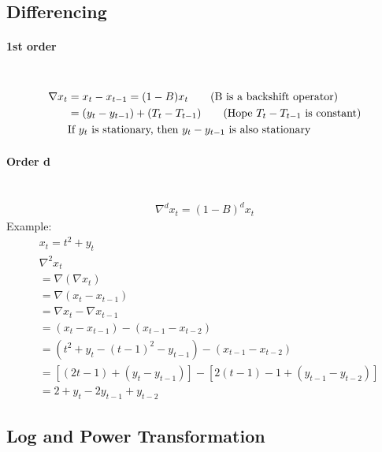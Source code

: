\subsection{Differencing} 
\paragraph{1st order} \mbox{}\\
    \begin{align*}
        \nabla x_t 
        & = x_t - x_{t-1} = (1-B)x_t \tag{B is a backshift operator} \\
        & = (y_t - y_{t-1}) + (T_t - T_{t-1}) \tag{Hope $T_t - T_{t-1}$ is constant} \\
        & \textrm{If $y_t$ is stationary, then $y_t - y_{t-1}$ is also stationary}
    \end{align*}
\paragraph{Order d} \mbox{}\\
    \begin{align*}
        \nabla^d x_t = (1-B)^d x_t 
    \end{align*}
Example:    
    \begin{align*}
        & x_t = t^2 + y_t \\
        & \nabla^2 x_t \\
        & = \nabla (\nabla x_t) \\
        & = \nabla (x_t - x_{t-1})\\
        & = \nabla x_t - \nabla x_{t-1}\\
        &= (x_t - x_{t-1}) - (x_{t-1} - x_{t-2}) \\
        &= (t^2 + y_t - (t-1)^2 - y_{t-1}) - (x_{t-1} - x_{t-2}) \\
        &= [(2t-1) + (y_t - y_{t-1})] - [2(t-1) - 1 + (y_{t-1} - y_{t-2})]\\
        &= 2 + y_t - 2y_{t-1} + y_{t-2} \tag{Constant + filtering of $y_t$ (approximation of second derivative)}
    \end{align*}
    
\subsection{Log and Power Transformation} 
